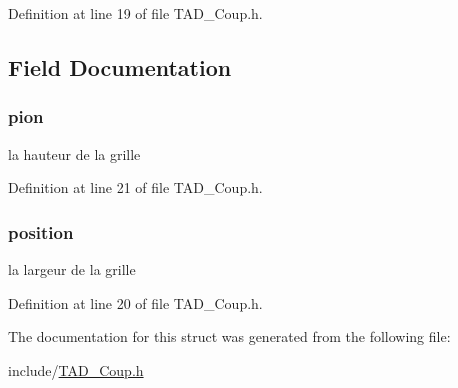Definition at line 19 of file T\+A\+D\+\_\+\+Coup.\+h.



\subsection{Field Documentation}
\hypertarget{struct_coup_ad71b3ad38e648f9979a7e37f3ac0c258}{}
\subsubsection[{pion}]{ pion}\label{struct_coup_ad71b3ad38e648f9979a7e37f3ac0c258}
la hauteur de la grille 

Definition at line 21 of file T\+A\+D\+\_\+\+Coup.\+h.

\hypertarget{struct_coup_a4d84949a19a29d3bb4dd2635c8241a83}{}
\subsubsection[{position}]{ position}\label{struct_coup_a4d84949a19a29d3bb4dd2635c8241a83}
la largeur de la grille 

Definition at line 20 of file T\+A\+D\+\_\+\+Coup.\+h.



The documentation for this struct was generated from the following file\+:\begin{DoxyCompactItemize}
\item 
include/\hyperlink{_t_a_d___coup_8h}{T\+A\+D\+\_\+\+Coup.\+h}\end{DoxyCompactItemize}
